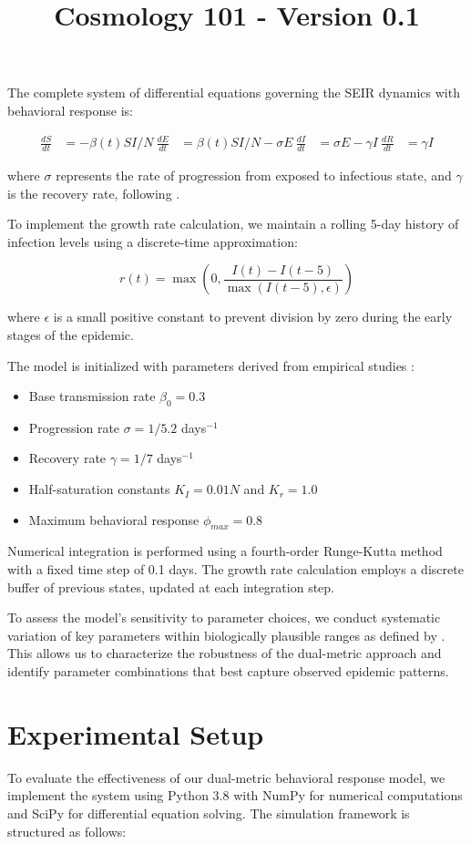 \documentclass{article}\usepackage{graphicx} \usepackage{amsmath} \usepackage{colortbl}\title{Cosmology 101 - Version 0.1}
\begin{document}
The complete system of differential equations governing the SEIR dynamics with behavioral response is:

\begin{align}
\frac{dS}{dt} &= -\beta(t)SI/N \
\frac{dE}{dt} &= \beta(t)SI/N - \sigma E \
\frac{dI}{dt} &= \sigma E - \gamma I \
\frac{dR}{dt} &= \gamma I
\end{align}

where $\sigma$ represents the rate of progression from exposed to infectious state, and $\gamma$ is the recovery rate, following \cite{anderson1992infectious}.

To implement the growth rate calculation, we maintain a rolling 5-day history of infection levels using a discrete-time approximation:

\begin{equation}
r(t) = \max\left(0, \frac{I(t) - I(t-5)}{\max(I(t-5), \epsilon)}\right)
\end{equation}

where $\epsilon$ is a small positive constant to prevent division by zero during the early stages of the epidemic.

The model is initialized with parameters derived from empirical studies \cite{hethcote2000mathematics}:
\begin{itemize}
\item Base transmission rate $\beta_0 = 0.3$
\item Progression rate $\sigma = 1/5.2$ days$^{-1}$
\item Recovery rate $\gamma = 1/7$ days$^{-1}$
\item Half-saturation constants $K_I = 0.01N$ and $K_r = 1.0$
\item Maximum behavioral response $\phi_{max} = 0.8$
\end{itemize}

Numerical integration is performed using a fourth-order Runge-Kutta method with a fixed time step of 0.1 days. The growth rate calculation employs a discrete buffer of previous states, updated at each integration step.

To assess the model's sensitivity to parameter choices, we conduct systematic variation of key parameters within biologically plausible ranges as defined by \cite{verelst2016behavioural}. This allows us to characterize the robustness of the dual-metric approach and identify parameter combinations that best capture observed epidemic patterns.\section{Experimental Setup}
To evaluate the effectiveness of our dual-metric behavioral response model, we implement the system using Python 3.8 with NumPy for numerical computations and SciPy for differential equation solving. The simulation framework is structured as follows:
\end{document}
